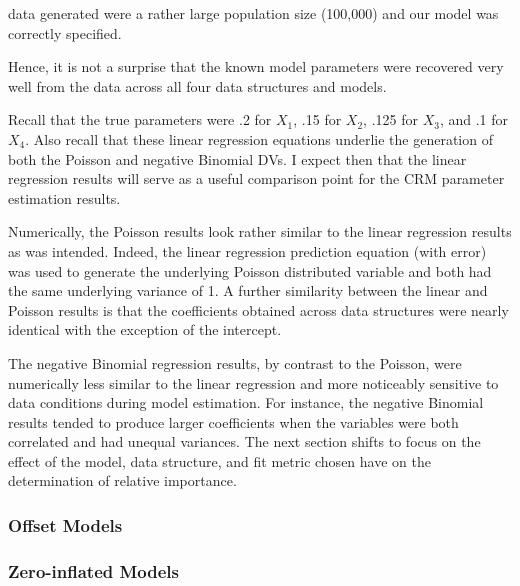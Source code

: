 \documentclass[ShortAfour,times,sageapa]{sagej}
\begin{document}
data generated were a rather large population size (100,000) and our model was correctly specified.  

Hence, it is not a surprise that the known model parameters were recovered very well from the data across all four data structures and models.

Recall that the true parameters were .2 for $X_1$, .15 for $X_2$, .125 for $X_3$, and .1 for $X_4$.  
Also recall that these linear regression equations underlie the generation of both the Poisson and negative Binomial DVs.  
I expect then that the linear regression results will serve as a useful comparison point for the CRM parameter estimation results.

%

Numerically, the Poisson results look rather similar to the linear regression results as was intended.  
Indeed, the linear regression prediction equation (with error) was used to generate the underlying Poisson distributed variable and both had the same underlying variance of 1.
A further similarity between the linear and Poisson results is that the coefficients obtained across data structures were nearly identical with the exception of the intercept.

%

The negative Binomial regression results, by contrast to the Poisson, were numerically less similar to the linear regression and more noticeably sensitive to data conditions during model estimation.
For instance, the negative Binomial results tended to produce larger coefficients when the variables were both correlated and had unequal variances.
The next section shifts to focus on the effect of the model, data structure, and fit metric chosen have on the determination of relative importance.

\subsubsection{Offset Models}

\subsubsection{Zero-inflated Models}




	
\end{document}
